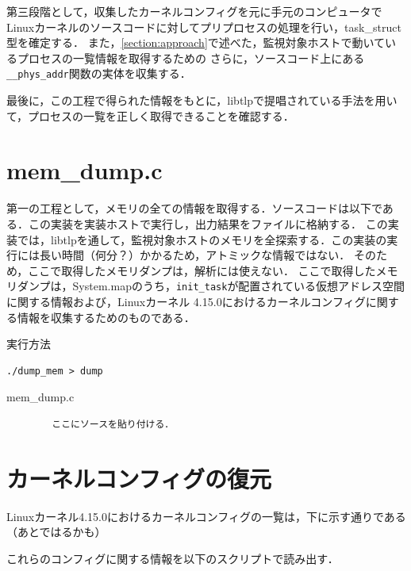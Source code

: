 第三段階として，収集したカーネルコンフィグを元に手元のコンピュータでLinuxカーネルのソースコードに対してプリプロセスの処理を行い，task\_struct型を確定する．
また，\ref{section:approach}で述べた，監視対象ホストで動いているプロセスの一覧情報を取得するための
さらに，ソースコード上にある\verb|__phys_addr|関数の実体を収集する．

最後に，この工程で得られた情報をもとに，libtlpで提唱されている手法を用いて，プロセスの一覧を正しく取得できることを確認する．

\section{mem\_dump.c}
\label{section:mem_dump}

第一の工程として，メモリの全ての情報を取得する．ソースコードは以下である．この実装を実装ホストで実行し，出力結果をファイルに格納する．
この実装では，libtlpを通して，監視対象ホストのメモリを全探索する．この実装の実行には長い時間（何分？）かかるため，アトミックな情報ではない．
そのため，ここで取得したメモリダンプは，解析には使えない．
ここで取得したメモリダンプは，System.mapのうち，\verb|init_task|が配置されている仮想アドレス空間に関する情報および，Linuxカーネル 4.15.0におけるカーネルコンフィグに関する情報を収集するためのものである．


\begin{itembox}[l]{実行方法}
    \begin{verbatim}
./dump_mem > dump
    \end{verbatim}
\end{itembox}

\begin{itembox}[l]{mem_dump.c}
    \begin{verbatim}
        ここにソースを貼り付ける．
    \end{verbatim}
\end{itembox}

\section{カーネルコンフィグの復元}
\label{section:restore_kconfig}

Linuxカーネル4.15.0におけるカーネルコンフィグの一覧は，下に示す通りである（あとではるかも）

これらのコンフィグに関する情報を以下のスクリプトで読み出す．

